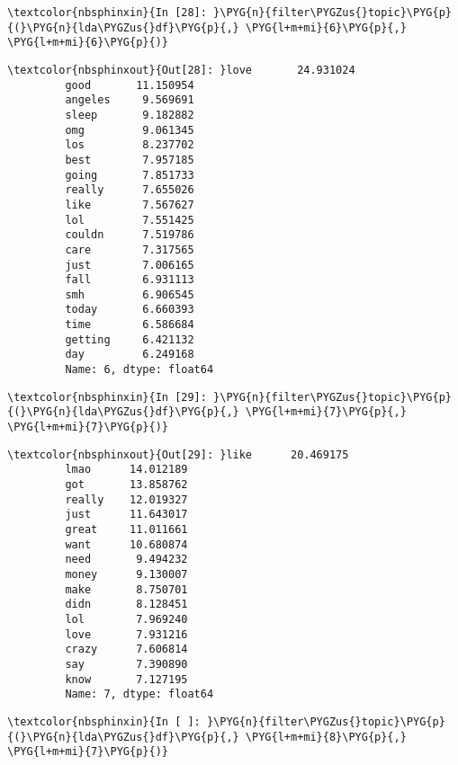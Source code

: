 \documentclass[letterpaper,10pt,english]{sphinxmanual}
\begin{document}
%
\begin{Verbatim}[commandchars=\\\{\}]
\textcolor{nbsphinxin}{In [28]: }\PYG{n}{filter\PYGZus{}topic}\PYG{p}{(}\PYG{n}{lda\PYGZus{}df}\PYG{p}{,} \PYG{l+m+mi}{6}\PYG{p}{,} \PYG{l+m+mi}{6}\PYG{p}{)}
\end{Verbatim}

%
\begin{Verbatim}[commandchars=\\\{\}]
\textcolor{nbsphinxout}{Out[28]: }love       24.931024
         good       11.150954
         angeles     9.569691
         sleep       9.182882
         omg         9.061345
         los         8.237702
         best        7.957185
         going       7.851733
         really      7.655026
         like        7.567627
         lol         7.551425
         couldn      7.519786
         care        7.317565
         just        7.006165
         fall        6.931113
         smh         6.906545
         today       6.660393
         time        6.586684
         getting     6.421132
         day         6.249168
         Name: 6, dtype: float64
\end{Verbatim}

%
\begin{Verbatim}[commandchars=\\\{\}]
\textcolor{nbsphinxin}{In [29]: }\PYG{n}{filter\PYGZus{}topic}\PYG{p}{(}\PYG{n}{lda\PYGZus{}df}\PYG{p}{,} \PYG{l+m+mi}{7}\PYG{p}{,} \PYG{l+m+mi}{7}\PYG{p}{)}
\end{Verbatim}

%
\begin{Verbatim}[commandchars=\\\{\}]
\textcolor{nbsphinxout}{Out[29]: }like      20.469175
         lmao      14.012189
         got       13.858762
         really    12.019327
         just      11.643017
         great     11.011661
         want      10.680874
         need       9.494232
         money      9.130007
         make       8.750701
         didn       8.128451
         lol        7.969240
         love       7.931216
         crazy      7.606814
         say        7.390890
         know       7.127195
         Name: 7, dtype: float64
\end{Verbatim}

%
\begin{Verbatim}[commandchars=\\\{\}]
\textcolor{nbsphinxin}{In [ ]: }\PYG{n}{filter\PYGZus{}topic}\PYG{p}{(}\PYG{n}{lda\PYGZus{}df}\PYG{p}{,} \PYG{l+m+mi}{8}\PYG{p}{,} \PYG{l+m+mi}{7}\PYG{p}{)}
\end{Verbatim}
\end{document}
